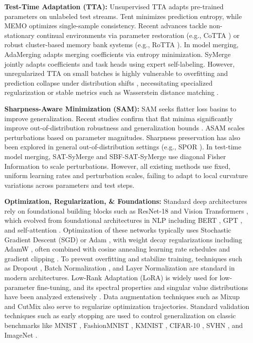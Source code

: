 \documentclass{article}
\theoremstyle{plain}
\theoremstyle{definition}
\theoremstyle{remark}
\begin{document}
\textbf{Test-Time Adaptation (TTA):} Unsupervised TTA adapts pre-trained parameters on unlabeled test streams. Tent \cite{tent} minimizes prediction entropy, while MEMO \cite{memo} optimizes single-sample consistency. Recent advances tackle non-stationary continual environments via parameter restoration (e.g., CoTTA \cite{cotta}) or robust cluster-based memory bank systems (e.g., RoTTA \cite{rotta}). In model merging, AdaMerging \cite{adamerging} adapts merging coefficients via entropy minimization. SyMerge \cite{symerge} jointly adapts coefficients and task heads using expert self-labeling. However, unregularized TTA on small batches is highly vulnerable to overfitting and prediction collapse under distribution shifts \cite{eata, representation_drift_study}, necessitating specialized regularization or stable metrics such as Wasserstein distance matching \cite{wasserstein_distance_distribution_shift}.

\textbf{Sharpness-Aware Minimization (SAM):} SAM \cite{sam} seeks flatter loss basins to improve generalization. Recent studies confirm that flat minima significantly improve out-of-distribution robustness and generalization bounds \cite{flat_minima_gen, sharp_flat_generalization, swa}. ASAM \cite{asam} scales perturbations based on parameter magnitudes. Sharpness preservation has also been explored in general out-of-distribution settings (e.g., SPOR \cite{spor}). In test-time model merging, SAT-SyMerge \cite{sata_tta} and SBF-SAT-SyMerge \cite{sbf_sat_symerge} use diagonal Fisher Information to scale perturbations. However, all existing methods use fixed, uniform learning rates and perturbation scales, failing to adapt to local curvature variations across parameters and test steps.

\textbf{Optimization, Regularization, \& Foundations:} Standard deep architectures rely on foundational building blocks such as ResNet-18 \cite{resnet} and Vision Transformers \cite{vit}, which evolved from foundational architectures in NLP including BERT \cite{bert}, GPT \cite{gpt}, and self-attention \cite{attention}. Optimization of these networks typically uses Stochastic Gradient Descent (SGD) \cite{sgd} or Adam \cite{adam}, with weight decay regularizations including AdamW \cite{adamw, adam_l2}, often combined with cosine annealing learning rate schedules \cite{cosine_annealing} and gradient clipping \cite{gradient_clipping}. To prevent overfitting and stabilize training, techniques such as Dropout \cite{dropout}, Batch Normalization \cite{batchnorm}, and Layer Normalization \cite{layernorm} are standard in modern architectures. Low-Rank Adaptation (LoRA) \cite{lora} is widely used for low-parameter fine-tuning, and its spectral properties and singular value distributions have been analyzed extensively \cite{spectral_properties_lora}. Data augmentation techniques such as Mixup \cite{mixup} and CutMix \cite{cutmix} also serve to regularize optimization trajectories. Standard validation techniques such as early stopping \cite{early_stopping} are used to control generalization on classic benchmarks like MNIST \cite{mnist}, FashionMNIST \cite{fashionmnist}, KMNIST \cite{kmnist}, CIFAR-10 \cite{cifar10}, SVHN \cite{svhn}, and ImageNet \cite{imagenet, goodfellow2016deep}.
\end{document}
